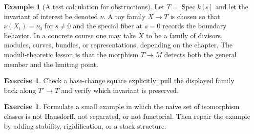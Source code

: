 \documentclass[11pt]{amsart}
\theoremstyle{definition}
\newtheorem{example}[theorem]{Example}
\newtheorem{exercise}[theorem]{Exercise}
\newcommand{\Spec}{\operatorname{Spec}}
\begin{document}
\begin{example}[A test calculation for obstructions]
Let $T=\Spec k[s]$ and let the invariant of interest be denoted $\nu$.  A toy family $X\to T$ is chosen so that $\nu(X_t)=\nu_0$ for $s\ne0$ and the special fiber at $s=0$ records the boundary behavior.  In a concrete course one may take $X$ to be a family of divisors, modules, curves, bundles, or representations, depending on the chapter.  The moduli-theoretic lesson is that the morphism $T\to M$ detects both the general member and the limiting point.
\end{example}
\begin{exercise}
Check a base-change square explicitly: pull the displayed family back along $T\prime\to T$ and verify which invariant is preserved.
\end{exercise}
\begin{exercise}
Formulate a small example in which the naive set of isomorphism classes is not Hausdorff, not separated, or not functorial.  Then repair the example by adding stability, rigidification, or a stack structure.
\end{exercise}
\clearpage
\end{document}
